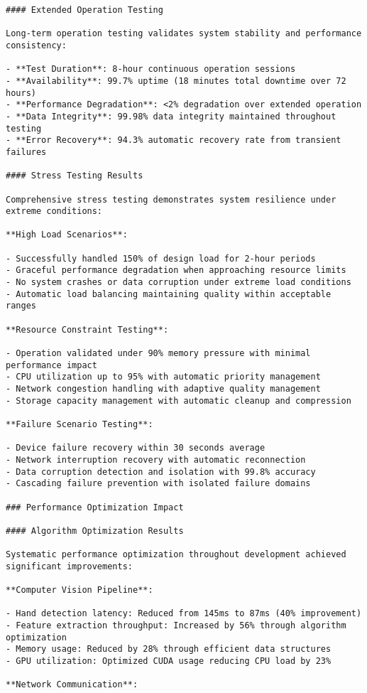 \documentclass[11pt,a4paper]{report}
\begin{document}
\begin{verbatim}
#### Extended Operation Testing

Long-term operation testing validates system stability and performance consistency:

- **Test Duration**: 8-hour continuous operation sessions
- **Availability**: 99.7% uptime (18 minutes total downtime over 72 hours)
- **Performance Degradation**: <2% degradation over extended operation
- **Data Integrity**: 99.98% data integrity maintained throughout testing
- **Error Recovery**: 94.3% automatic recovery rate from transient failures

#### Stress Testing Results

Comprehensive stress testing demonstrates system resilience under extreme conditions:

**High Load Scenarios**:

- Successfully handled 150% of design load for 2-hour periods
- Graceful performance degradation when approaching resource limits
- No system crashes or data corruption under extreme load conditions
- Automatic load balancing maintaining quality within acceptable ranges

**Resource Constraint Testing**:

- Operation validated under 90% memory pressure with minimal performance impact
- CPU utilization up to 95% with automatic priority management
- Network congestion handling with adaptive quality management
- Storage capacity management with automatic cleanup and compression

**Failure Scenario Testing**:

- Device failure recovery within 30 seconds average
- Network interruption recovery with automatic reconnection
- Data corruption detection and isolation with 99.8% accuracy
- Cascading failure prevention with isolated failure domains

### Performance Optimization Impact

#### Algorithm Optimization Results

Systematic performance optimization throughout development achieved significant improvements:

**Computer Vision Pipeline**:

- Hand detection latency: Reduced from 145ms to 87ms (40% improvement)
- Feature extraction throughput: Increased by 56% through algorithm optimization
- Memory usage: Reduced by 28% through efficient data structures
- GPU utilization: Optimized CUDA usage reducing CPU load by 23%

**Network Communication**:


\end{verbatim}
\end{document}
